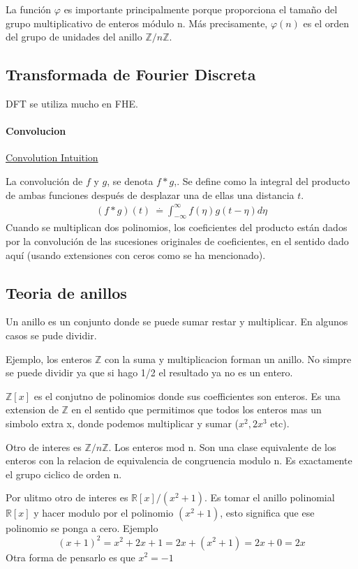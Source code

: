 \documentclass[12pt, oneside]{article}
\newcommand{\R}{\mathbb{R}}
\newcommand{\Z}{\mathbb{Z}}
\begin{document}
La función $\varphi$ es importante principalmente porque proporciona el tamaño del
grupo multiplicativo de enteros módulo n.
Más precisamente, $\varphi (n)$ es el orden del grupo de unidades del anillo
$\mathbb {Z} /n\mathbb {Z}$.

\subsection{Transformada de Fourier Discreta}
DFT se utiliza mucho en FHE.

\paragraph{Convolucion} %
\href{https://betterexplained.com/articles/intuitive-convolution/}{Convolution Intuition}

La convolución de $f$ y $g$, se denota $f*g$,.
Se define como la integral del producto de ambas
funciones después de desplazar una de ellas una distancia $t$.
\begin{align*}
(f*g)(t)\ {\stackrel {\mathrm {.} }{=}}\int _{-\infty }^{\infty }f(\eta )g(t-\eta )d\eta
\end{align*}
Cuando se multiplican dos polinomios, los coeficientes del producto están dados
por la convolución de las sucesiones originales de coeficientes, en el sentido dado
aquí (usando extensiones con ceros como se ha mencionado).

\subsection{Teoria de anillos}
Un anillo es un conjunto donde se puede sumar restar y multiplicar.
En algunos casos se pude dividir.

Ejemplo, los enteros $\Z$ con la suma y multiplicacion forman un anillo.
No simpre se puede dividir ya que si hago 1/2 el resultado ya no es un entero.

$\Z[x]$ es el conjutno de polinomios donde sus coefficientes son enteros.
Es una extension de $\Z$ en el sentido que permitimos que todos los enteros
mas un simbolo extra x, donde podemos multiplicar y sumar ($x^2, 2x^3$ etc).

Otro de interes es  $\Z/n\Z$. Los enteros mod n.
Son una clase equivalente de los enteros con la relacion de equivalencia de congruencia
modulo n.
Es exactamente el grupo ciclico de orden n.

Por ulitmo otro de interes es $\R[x]/(x^2+1)$.
Es tomar el anillo polinomial $\R[x]$ y hacer modulo por el polinomio $(x^2+1)$,
esto significa que ese polinomio se ponga a cero.
Ejemplo
\begin{equation*}
  (x+1)^2 = x^2 + 2x + 1 = 2x + (x^2 + 1) = 2x + 0 = 2x
\end{equation*}
Otra forma de pensarlo es que $x^2 = -1$
\end{document}
